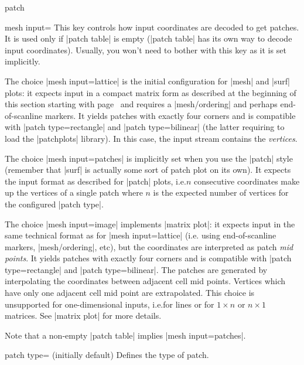 {\begin{plottype}[/pgfplots]{patch}
    \begin{pgfplotskey}{mesh input=}
        This key controls how input coordinates are decoded to get patches. It
        is used only if |patch table| is empty (|patch table| has its own way
        to decode input coordinates). Usually, you won't need to bother with
        this key as it is set implicitly.

        The choice |mesh input=lattice| is the initial configuration for |mesh|
        and |surf| plots: it expects input in a compact matrix form as
        described at the beginning of this section starting with
        page~\pageref{sec:3d} and requires a |mesh/ordering| and perhaps
        end-of-scanline markers. It yields patches with exactly four corners
        and is compatible with |patch type=rectangle| and |patch type=bilinear|
        (the latter requiring to load the |patchplots| library). In this case,
        the input stream contains the \emph{vertices}.

        The choice |mesh input=patches| is implicitly set when you use the
        |patch| style (remember that |surf| is actually some sort of patch plot
        on its own). It expects the input format as described for |patch|
        plots, i.e.\@ $n$ consecutive coordinates make up the vertices of a
        single patch where $n$ is the expected number of vertices for the
        configured |patch type|.

        The choice |mesh input=image| implements |matrix plot|: it expects
        input in the same technical format as for |mesh input=lattice| (i.e.\@
        using end-of-scanline markers, |mesh/ordering|, etc), but the
        coordinates are interpreted as patch \emph{mid points}. It yields
        patches with exactly four corners and is compatible with
        |patch type=rectangle| and |patch type=bilinear|. The patches are
        generated by interpolating the coordinates between adjacent cell mid
        points. Vertices which have only one adjacent cell mid point are
        extrapolated. This choice is unsupported for one-dimensional inputs,
        i.e.\@ for lines or for $1\times n$ or $n \times 1$ matrices. See
        |matrix plot| for more details.

        Note that a non-empty |patch table| implies |mesh input=patches|.
    \end{pgfplotskey}

    \begin{pgfplotskey}{patch type= (initially default)}
    \label{key:patch:type}
        Defines the type of patch.


\end{pgfplotskey}
\end{plottype}}
